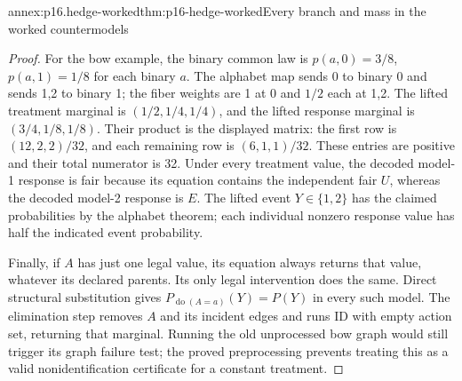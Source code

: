 \begin{annexitem}{annex:p16.hedge-worked}{thm:p16-hedge-worked}{Every branch and mass in the worked countermodels}
\begin{proof}
For the bow example, the binary common law is
\(p(a,0)=3/8\), \(p(a,1)=1/8\) for each binary \(a\).
The alphabet map sends 0 to binary 0 and sends 1,2 to binary 1;
the fiber weights are 1 at 0 and \(1/2\) each at 1,2.
The lifted treatment marginal is \((1/2,1/4,1/4)\), and the
lifted response marginal is \((3/4,1/8,1/8)\). Their product
is the displayed matrix: the first row is \((12,2,2)/32\),
and each remaining row is \((6,1,1)/32\). These entries are
positive and their total numerator is 32. Under every treatment
value, the decoded model-1 response is fair because its equation
contains the independent fair \(U\), whereas the decoded model-2
response is \(E\). The lifted event \(Y\in\{1,2\}\) has
the claimed probabilities by the alphabet theorem; each individual
nonzero response value has half the indicated event probability.

Finally, if \(A\) has just one legal value, its equation always
returns that value, whatever its declared parents. Its only legal
intervention does the same. Direct structural substitution gives
\(P_{\operatorname{do}(A=a)}(Y)=P(Y)\) in every such model.
The elimination step removes \(A\) and its incident edges and
runs ID with empty action set, returning that marginal. Running
the old unprocessed bow graph would still trigger its graph failure
test; the proved preprocessing prevents treating this as a valid
nonidentification certificate for a constant treatment.
\end{proof}
\end{annexitem}
